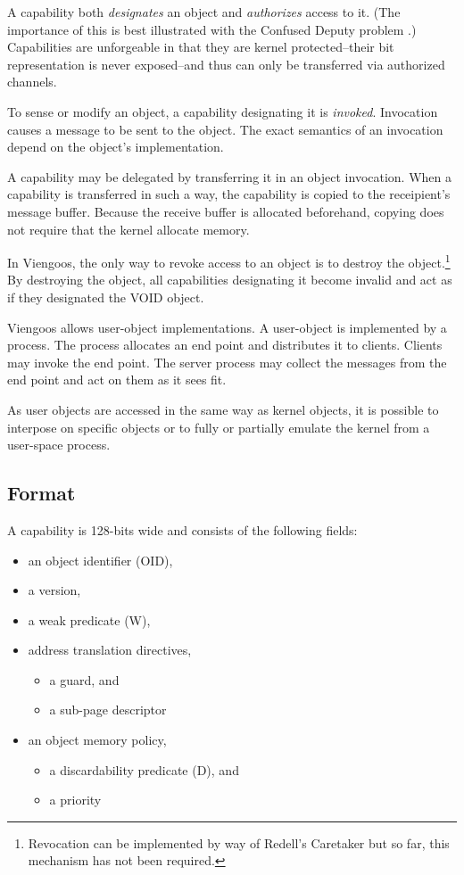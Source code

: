 A capability both \emph{designates} an object and \emph{authorizes}
access to it.  (The importance of this is best illustrated with the
Confused Deputy problem \cite{hardy88confused-deputy}.)  Capabilities
are unforgeable in that they are kernel protected--their bit
representation is never exposed--and thus can only be transferred via
authorized channels.

To sense or modify an object, a capability designating it is
\emph{invoked}.  Invocation causes a message to be sent to the object.
The exact semantics of an invocation depend on the object's
implementation.

A capability may be delegated by transferring it in an object
invocation.  When a capability is transferred in such a way, the
capability is copied to the receipient's message buffer.  Because the
receive buffer is allocated beforehand, copying does not require that
the kernel allocate memory.

In Viengoos, the only way to revoke access to an object is to destroy
the object.\footnote{Revocation can be implemented by way of Redell's
  Caretaker but so far, this mechanism has not been required.}  By
destroying the object, all capabilities designating it become invalid
and act as if they designated the VOID object.

Viengoos allows user-object implementations.  A user-object is
implemented by a process.  The process allocates an end point and
distributes it to clients.  Clients may invoke the end point.  The
server process may collect the messages from the end point and act on
them as it sees fit.

As user objects are accessed in the same way as kernel objects, it is
possible to interpose on specific objects or to fully or partially
emulate the kernel from a user-space process.

\subsection{Format}

A capability is 128-bits wide and consists of the following fields:

\begin{itemize}
\item an object identifier (OID),
\item a version,
\item a weak predicate (W),
\item address translation directives,
  \begin{itemize}
  \item a guard, and
  \item a sub-page descriptor
  \end{itemize}
\item an object memory policy,
  \begin{itemize}
  \item a discardability predicate (D), and
  \item a priority
  \end{itemize}
\end{itemize}

